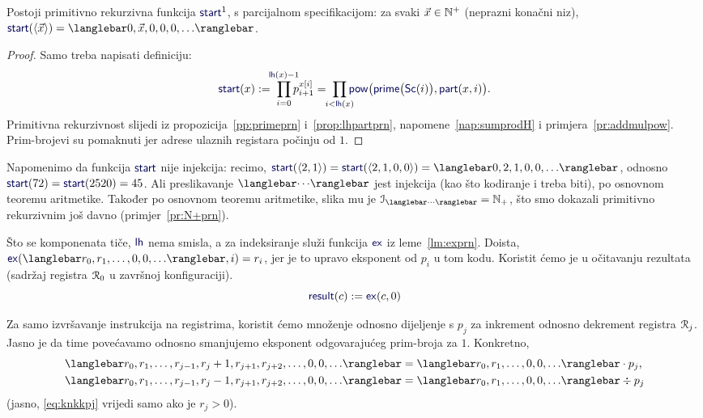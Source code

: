 \begin{lema}[{name=[primitivna rekurzivnost generatora početne konfiguracije]}]\label{lm:startprn}
    Postoji primitivno rekurzivna funkcija $\f{start}^1$\!, s parcijalnom specifikacijom: za svaki $\vec x\in{\mathbb N}^+$\! (neprazni konačni niz), $\f{start}(\langle\vec x\rangle)=\knk{0,\vec x,0,0,0,\dotsc}$.
\end{lema}
\begin{proof}
Samo treba napisati definiciju:
\begin{equation}
    \f{start}(x):=\;\prod_{i=0}^{\mathclap{\f{lh}(x)-1}}p_{i+1}^{x[i]}=\;\prod_{\mathclap{i<\f{lh}(x)}}\f{pow}\bigl(\f{prime}\bigl(\f{Sc}(i)\bigr),\f{part}(x,i)\bigr)\text.
\end{equation}
Primitivna rekurzivnost slijedi iz propozicija~\ref{pp:primeprn} i~\ref{prop:lhpartprn}, napomene~\ref{nap:sumprodH} i primjera~\ref{pr:addmulpow}. Prim-brojevi su pomaknuti jer adrese ulaznih registara počinju od $1$.
\end{proof}

Napomenimo da funkcija $\f{start}$ nije injekcija: recimo, $\f{start}(\langle2,1\rangle)=\f{start}(\langle2,1,0,0\rangle)=\knk{0,2,1,0,0,\dotsc}$, odnosno $\f{start}(72)=\f{start}(2520)=45$. Ali preslikavanje $\knk{\cdots}$ jest injekcija (kao što kodiranje i treba biti), po osnovnom teoremu aritmetike. Također po osnovnom teoremu aritmetike, slika mu je $\im{\knk{\cdots}}=\N_+$, što smo dokazali primitivno rekurzivnim još davno (primjer~\ref{pr:N+prn}).

Što se komponenata tiče, $\f{lh}$ nema smisla, a za indeksiranje služi funkcija $\f{ex}$ iz leme~\ref{lm:exprn}. Doista, $\f{ex}(\knk{r_0,r_1,\dotsc,0,0,\dotsc},i)=r_i$, jer je to upravo eksponent od $p_i$ u tom kodu. Koristit ćemo je u očitavanju rezultata (sadržaj registra $\mathcal R_{0}$ u završnoj konfiguraciji).
\begin{equation}\label{eq:resultdef}
    \f{result}(c):=\f{ex}(c,0)
\end{equation}

Za samo izvršavanje instrukcija na registrima, koristit ćemo množenje odnosno dijeljenje s $p_j$ za inkrement odnosno dekrement registra $\mathcal R_{j}$. Jasno je da time povećavamo odnosno smanjujemo eksponent odgovarajućeg prim-broja za $1$. Konkretno,
\begin{align}
\label{eq:knkppj}\knk{r_0,r_1,\dotsc,r_{j-1},r_j+1,r_{j+1},r_{j+2},\dotsc,0,0,\dotsc}
&=
\knk{r_0,r_1,\dotsc,0,0,\dotsc}\cdot p_j\text,
\\%
\label{eq:knkkpj}\knk{r_0,r_1,\dotsc,r_{j-1},r_j-1,r_{j+1},r_{j+2},\dotsc,0,0,\dotsc}
&=
\knk{r_0,r_1,\dotsc,0,0,\dotsc}\div p_j
\end{align}
(jasno, \eqref{eq:knkkpj} vrijedi samo ako je $r_j>0$).

